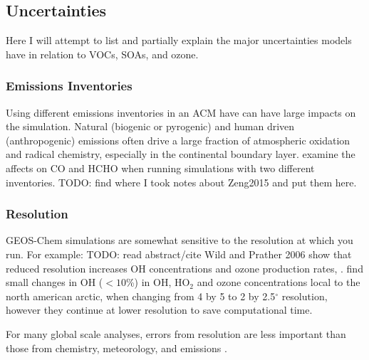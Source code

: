   \subsection{Uncertainties}
    \label{LR:Models:Unc}
    Here I will attempt to list and partially explain the major uncertainties models have in relation to  VOCs, SOAs, and ozone. 
    
    \subsubsection{Emissions Inventories}
      Using different emissions inventories in an ACM have can have large impacts on the simulation.
      Natural (biogenic or pyrogenic) and human driven (anthropogenic) emissions often drive a large fraction of atmospheric oxidation and radical chemistry, especially in the continental boundary layer.
      \cite{Zeng2015} examine the affects on CO and HCHO when running simulations with two different inventories.
      TODO: find where I took notes about Zeng2015 and put them here.
    
    \subsubsection{Resolution}
      \label{LR:Models:Unc:Resolution}
      GEOS-Chem simulations are somewhat sensitive to the resolution at which you run.
      For example: TODO: read abstract/cite Wild and Prather 2006 show that reduced resolution increases OH concentrations and ozone production rates, \citep{Wild2006}.
      \cite{Christian2017} find small changes in OH ($<10$\%) in OH, HO$_2$ and ozone concentrations local to the north american arctic, when changing from 4 by 5 to 2 by 2.5$^{\circ}$ resolution, however they continue at lower resolution to save computational time.
      
      For many global scale analyses, errors from resolution are less important than those from chemistry, meteorology, and emissions \citep{Christian2017}.
      
      
      
    
